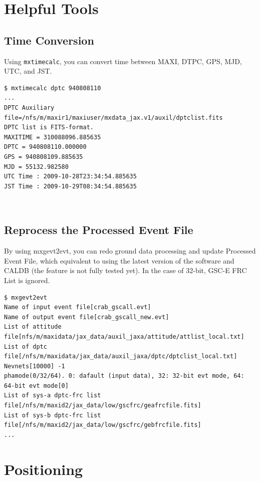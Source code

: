 \documentclass[10pt]{report}
\renewcommand{\_}{\textscale{.5}{\textbf{\textunderscore}}}
\begin{document}
\clearpage

\chapter{Helpful Tools}\label{app:2}
\section{Time Conversion}\label{appsec:2.1}

Using \texttt{mxtimecalc}, you can convert time between MAXI, DTPC, GPS, MJD, UTC, and JST. \\

\begin{lstlisting}
$ mxtimecalc dptc 940808110
...
DPTC Auxiliary file=/nfs/m/maxir1/maxiuser/mxdata_jax.v1/auxil/dptclist.fits
DPTC list is FITS-format.
MAXITIME = 310088096.885635
DPTC = 940808110.000000
GPS = 940808109.885635
MJD = 55132.982580
UTC Time : 2009-10-28T23:34:54.885635
JST Time : 2009-10-29T08:34:54.885635
\end{lstlisting}

\

\section{Reprocess the Processed Event File}\label{appsec:2.2}

By using mxgevt2evt, you can redo ground data processing and update Processed Event File, which equivalent to using the latest version of the software and CALDB (the feature is not fully tested yet). In the case of 32-bit, GSC-E FRC List is ignored.\\

\begin{lstlisting}
$ mxgevt2evt
Name of input event file[crab_gscall.evt]
Name of output event file[crab_gscall_new.evt]
List of attitude file[nfs/m/maxidata/jax_data/auxil_jaxa/attitude/attlist_local.txt]
List of dptc file[/nfs/m/maxidata/jax_data/auxil_jaxa/dptc/dptclist_local.txt]
Nevnets[10000] -1
phamode(0/32/64). 0: dafault (input data), 32: 32-bit evt mode, 64: 64-bit evt mode[0]
List of sys-a dptc-frc list file[/nfs/m/maxid2/jax_data/low/gscfrc/geafrcfile.fits]
List of sys-b dptc-frc list file[/nfs/m/maxid2/jax_data/low/gscfrc/gebfrcfile.fits]
...
\end{lstlisting}

\clearpage

\chapter{Positioning}\label{app:3}
\end{document}
